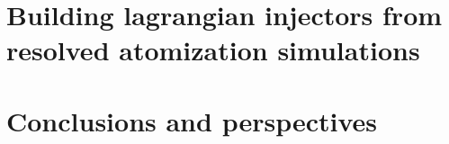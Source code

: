 \documentclass[twoside]{report}
\begin{document}

\newpage





\part{Building lagrangian injectors from resolved atomization simulations}

\newpage 

%
%
\newpage
%

%
%
%
%



\part{Conclusions and perspectives}

%


\fancyhead[LO]{}
\nocite{*}


\newpage


%
%
%
\end{document}

